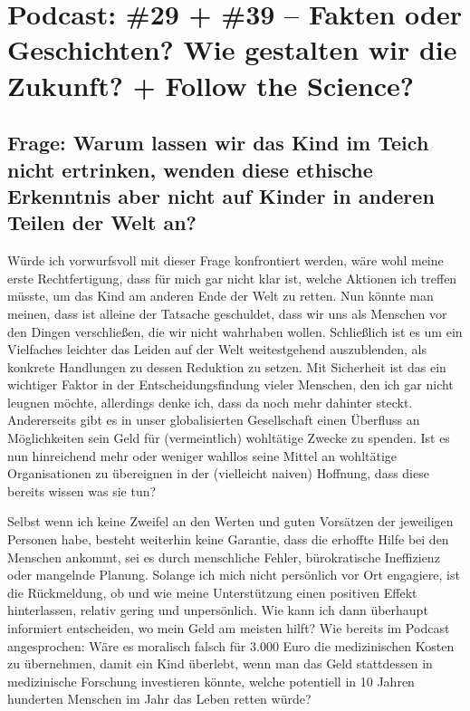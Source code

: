 \documentclass[twoside, a4paper, DIV=11, open=any, bibliography=totoc]{scrbook}
\begin{document}
\section{Podcast: \#29 + \#39 -- Fakten oder Geschichten? Wie gestalten wir die Zukunft?
+ Follow the Science?}

\subsection{Frage: Warum lassen wir das Kind im Teich nicht ertrinken,
wenden diese ethische Erkenntnis aber nicht auf Kinder in anderen Teilen der Welt an?}

Würde ich vorwurfsvoll mit dieser Frage konfrontiert werden, wäre wohl meine
erste Rechtfertigung, dass für mich gar nicht klar ist, welche Aktionen ich treffen
müsste, um das Kind am anderen Ende der Welt zu retten. Nun könnte man meinen,
dass ist alleine der Tatsache geschuldet, dass wir uns als Menschen vor den Dingen
verschließen, die wir nicht wahrhaben wollen. Schließlich ist es um ein Vielfaches
leichter das Leiden auf der Welt weitestgehend auszublenden, als konkrete Handlungen
zu dessen Reduktion zu setzen.
Mit Sicherheit ist das ein wichtiger Faktor in der Entscheidungsfindung vieler Menschen,
den ich gar nicht leugnen möchte, allerdings denke ich, dass da noch mehr dahinter steckt.
Andererseits gibt es in unser globalisierten Gesellschaft einen Überfluss an
Möglichkeiten sein Geld für (vermeintlich) wohltätige Zwecke zu spenden.
Ist es nun hinreichend mehr oder weniger wahllos seine Mittel an wohltätige Organisationen
zu übereignen in der (vielleicht naiven) Hoffnung, dass diese bereits wissen was sie tun?

Selbst wenn ich keine Zweifel an den Werten und guten Vorsätzen der jeweiligen Personen
habe, besteht weiterhin keine Garantie, dass die erhoffte Hilfe bei den Menschen ankommt,
sei es durch menschliche Fehler, bürokratische Ineffizienz oder mangelnde Planung.
Solange ich mich nicht persönlich vor Ort engagiere, ist die Rückmeldung, ob und wie
meine Unterstützung einen positiven Effekt hinterlassen, relativ gering und unpersönlich.
Wie kann ich dann überhaupt informiert entscheiden, wo mein Geld am meisten hilft?
Wie bereits im Podcast angesprochen: Wäre es moralisch falsch für 3.000 Euro die medizinischen
Kosten zu übernehmen, damit ein Kind überlebt, wenn man das Geld stattdessen in
medizinische Forschung investieren könnte, welche potentiell in 10 Jahren hunderten
Menschen im Jahr das Leben retten würde?
\end{document}
